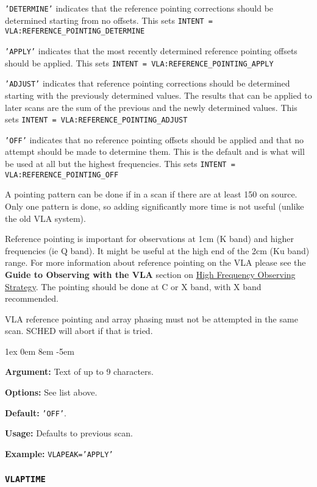 \documentclass{report}
\newcommand{\rcwbox}[5]{
  \begin{list}{}{\parsep 1ex  \itemsep 0em
                 \leftmargin 8em  \itemindent -5em }
    \item {\bf Argument:} #1
    \item {\bf Options:}  #2
    \item {\bf Default:}  #3
    \item {\bf Usage:}    #4
    \item {\bf Example:}  #5
  \end{list}
}
\begin{document}
\begin{description}

\item {\tt 'DETERMINE'} indicates that the reference pointing
corrections should be determined starting from no offsets.  This sets
{\tt INTENT = VLA:REFERENCE\_POINTING\_DETERMINE}

\item {\tt 'APPLY'} indicates that the most recently determined reference
pointing offsets should be applied.  This sets {\tt INTENT =
VLA:REFERENCE\_POINTING\_APPLY}

\item {\tt 'ADJUST'} indicates that reference pointing corrections should be
determined starting with the previously determined values.  The
results that can be applied to later scans are the sum of the previous
and the newly determined values.  This sets {\tt INTENT =
VLA:REFERENCE\_POINTING\_ADJUST}

\item {\tt 'OFF'} indicates that no reference pointing offsets should be
applied and that no attempt should be made to determine them.  This
is the default and is what will be used at all but the highest 
frequencies.  This sets {\tt INTENT = VLA:REFERENCE\_POINTING\_OFF}

\end{description}

A pointing pattern can be done if in a scan if there are at least 150
on source.  Only one pattern is done, so adding significantly more
time is not useful (unlike the old VLA system). 

Reference pointing is important for observations at 1cm (K band) and
higher frequencies (ie Q band).  It might be useful at the high end
of the 2cm (Ku band) range.  For more information about reference
pointing on the VLA please see the {\bf Guide to Observing with the VLA}
section on 
{\href{https://science.nrao.edu/facilities/vla/docs/manuals/obsguide/modes/hifreq/strategy}{High Frequency Observing Strategy}}.
The pointing should be done at C or X band, with X band recommended.

VLA reference pointing and array phasing must not be attempted in
the same scan.  SCHED will abort if that is tried.

\rcwbox
{Text of up to 9 characters.}
{See list above.}
{{\tt 'OFF'}.}
{Defaults to previous scan.}
{{\tt VLAPEAK='APPLY'}}


\subsubsection{\label{MP:VLAPTIME}{\tt VLAPTIME}}
\end{document}
